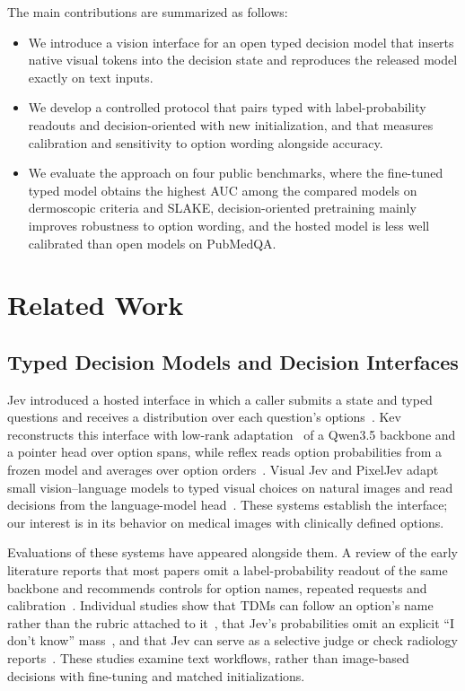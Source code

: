 \documentclass{article}
\begin{document}
The main contributions are summarized as follows:
\begin{itemize}[leftmargin=*,itemsep=1pt,topsep=2pt]
  \item We introduce a vision interface for an open typed decision model that inserts native visual tokens into the decision state and reproduces the released model exactly on text inputs.
  \item We develop a controlled protocol that pairs typed with label-probability readouts and decision-oriented with new initialization, and that measures calibration and sensitivity to option wording alongside accuracy.
  \item We evaluate the approach on four public benchmarks, where the fine-tuned typed model obtains the highest AUC among the compared models on dermoscopic criteria and SLAKE, decision-oriented pretraining mainly improves robustness to option wording, and the hosted model is less well calibrated than open models on PubMedQA.
\end{itemize}

\section{Related Work}
\subsection{Typed Decision Models and Decision Interfaces}
Jev introduced a hosted interface in which a caller submits a state and typed questions and receives a distribution over each question's options~\citep{typesafe2026jev,typesafe2026blog}. Kev reconstructs this interface with low-rank adaptation~\citep{hu2022lora} of a Qwen3.5 backbone and a pointer head over option spans, while reflex reads option probabilities from a frozen model and averages over option orders~\citep{palmer2026kev,raghavan2026reflex}. Visual Jev and PixelJev adapt small vision--language models to typed visual choices on natural images and read decisions from the language-model head~\citep{yu2026visualjev,zhou2026pixeljev}. These systems establish the interface; our interest is in its behavior on medical images with clinically defined options.

Evaluations of these systems have appeared alongside them. A review of the early literature reports that most papers omit a label-probability readout of the same backbone and recommends controls for option names, repeated requests and calibration~\citep{audit2026tdm}. Individual studies show that TDMs can follow an option's name rather than the rubric attached to it~\citep{sun2026typesafe}, that Jev's probabilities omit an explicit ``I don't know'' mass~\citep{porcedda2026sys1cal}, and that Jev can serve as a selective judge or check radiology reports~\citep{li2026jevjudge,huang2026radjev}. These studies examine text workflows, rather than image-based decisions with fine-tuning and matched initializations.
\end{document}
